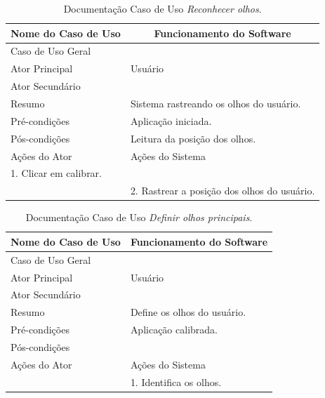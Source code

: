 \begin{longtable}{|l|l|}
\caption{Documentação Caso de Uso \textit{Reconhecer olhos}.} \label{tab:dcu-1} \\
\hline 
\multicolumn{1}{|c|}{\textbf{Nome do Caso de Uso}} & 
\multicolumn{1}{c|}{\textbf{Funcionamento do Software}} \\ \hline 
\endfirsthead
\hline
Caso de Uso Geral &  \\ \hline
Ator Principal & Usuário\\ \hline
Ator Secundário & \\ \hline
Resumo & Sistema rastreando os olhos do usuário. \\ \hline 
Pré-condições &  Aplicação iniciada. \\ \hline 
Pós-condições &  Leitura da posição dos olhos. \\ \hline
 Ações do Ator& Ações do Sistema \\ \hline
 1.	Clicar em calibrar.&  \\ \hline
 & 2. Rastrear a posição dos olhos do usuário. \\ \hline
\end{longtable}

\begin{longtable}{|l|l|}
\caption{Documentação Caso de Uso \textit{Definir olhos principais}.} \label{tab:dcu-1} \\
\hline 
\multicolumn{1}{|c|}{\textbf{Nome do Caso de Uso}} & 
\multicolumn{1}{c|}{\textbf{Funcionamento do Software}} \\ \hline 
\endfirsthead
\hline
Caso de Uso Geral &  \\ \hline
Ator Principal & Usuário\\ \hline
Ator Secundário & \\ \hline
Resumo & Define os olhos do usuário. \\ \hline 
Pré-condições &  Aplicação calibrada. \\ \hline 
Pós-condições &  \\ \hline
 Ações do Ator& Ações do Sistema \\ \hline
 & 1. Identifica os olhos. \\ \hline
\end{longtable}

